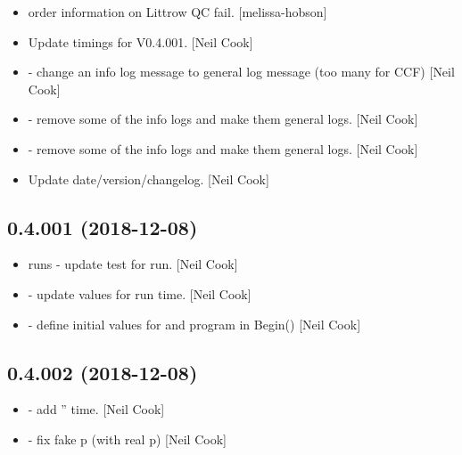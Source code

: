\documentclass[a4paper,10pt,english]{report}
\begin{document}
\begin{itemize}
\item {} 
 order information on Littrow QC fail. {[}melissa-hobson{]}

\item {} 
Update timings for V0.4.001. {[}Neil Cook{]}

\item {} 
 - change an info log message to general log message (too
many for CCF) {[}Neil Cook{]}

\item {} 
 - remove some of the info logs and make them general
logs. {[}Neil Cook{]}

\item {} 
 - remove some of the info logs and make them general
logs. {[}Neil Cook{]}

\item {} 
Update date/version/changelog. {[}Neil Cook{]}

\end{itemize}


\subsection{0.4.001 (2018-12-08)}
\label{\detokenize{misc/changelog:id243}}\begin{itemize}
\item {} 
 runs - update test for run. {[}Neil Cook{]}

\item {} 
 - update values for run time. {[}Neil Cook{]}

\item {} 
 - define initial values for  and program in
Begin() {[}Neil Cook{]}

\end{itemize}


\subsection{0.4.002 (2018-12-08)}
\label{\detokenize{misc/changelog:id244}}\begin{itemize}
\item {} 
 - add ” time. {[}Neil Cook{]}

\item {} 
 - fix fake p (with real p) {[}Neil Cook{]}

\end{itemize}
\end{document}
